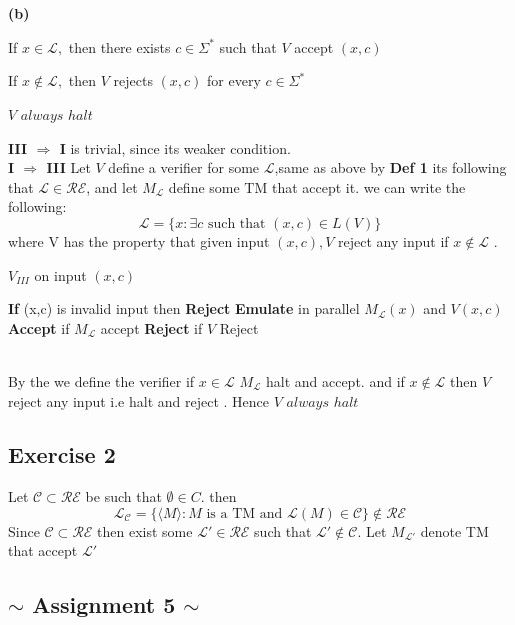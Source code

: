 \documentclass[12pt]{article}
\begin{document}
\\\\
\textbf{(b)}
\begin{list}{•}{  \textbf{ Definition III}}
\item If $x\in \mathcal{L},$ then there exists $c\in \Sigma^*$ such that $V$ accept $(x,c)$
\item If $x\notin \mathcal{L},$  then $V$ rejects $(x, c)$ for every $c\in \Sigma^*$
\item $V$ $always$ $halt$
\end{list}
\textbf{III $\Rightarrow$ I} is trivial, since its weaker condition.
\pagebreak\\
\textbf{I $\Rightarrow$ III} Let $V$ define  a verifier for some $\mathcal{L}$,same as above by \textbf{Def 1} its following that $\mathcal{L}\in \mathcal{RE}$, and let $M_{\mathcal{L}}$ define some TM that accept it. we  can write the following:
\[\mathcal{L}=\{x: \exists c \text{ such that } (x,c)\in L(V)\}
\]
where V has the property that given input $(x,c), V$ reject any input if $x \notin \mathcal{L}$ .
\begin{algorithm}
\caption{  $V_{III}$ on input $(x,c)$ }\label{alg:cap}
\begin{algorithmic}
\State \textbf{If} (x,c) is invalid input then \textbf{Reject}
\State \textbf{Emulate} in parallel $M_{\mathcal{L}}(x)$ and $V(x,c)$
\State \textbf{Accept}{ if $M_{\mathcal{L}}$ accept } 
\State \textbf{Reject}{ if $V$ Reject } 
\end{algorithmic}
\end{algorithm}\\
By the  we define the verifier if $x\in \mathcal{L}$ $M_{\mathcal{L}}$ halt and accept. and if $x\notin \mathcal{L}$ then $V$ reject any input i.e halt and reject . Hence $V$ $always$ $halt$
\subsection{Exercise 2}
Let $\mathcal{C}\subset \mathcal{RE}$ be such that $\emptyset \in C$. then
\[\mathcal{L_C} =\{ \langle M \rangle: M \text{ is a TM and } \mathcal{L}(M) \in \mathcal{C} \}  \notin \mathcal{RE}
\]
Since $\mathcal{C}\subset \mathcal{RE}$ then exist some $\mathcal{L'}\in\mathcal{RE} $ such that $\mathcal{L'}\notin \mathcal{C}$. Let $M_{\mathcal{L'}}$ denote TM that accept $\mathcal{L'}$
\begin{center}
\section{$\sim$ Assignment 5  $\sim$}
\end{center}
\end{document}
